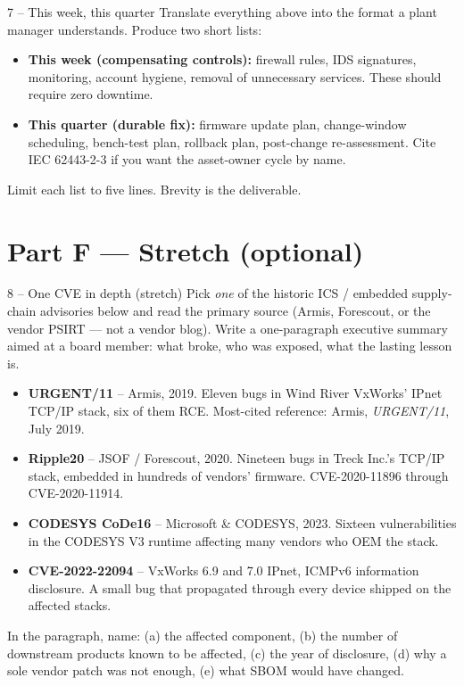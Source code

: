 \documentclass[11pt,a4paper]{article}
\begin{document}
\begin{stepbox}{7 -- This week, this quarter}
Translate everything above into the format a plant manager understands. Produce two short lists:

\begin{itemize}\setlength{\itemsep}{1pt}
  \item \textbf{This week (compensating controls):} firewall rules, IDS signatures, monitoring, account hygiene, removal of unnecessary services. These should require zero downtime.
  \item \textbf{This quarter (durable fix):} firmware update plan, change-window scheduling, bench-test plan, rollback plan, post-change re-assessment. Cite IEC 62443-2-3 if you want the asset-owner cycle by name.
\end{itemize}

Limit each list to five lines. Brevity is the deliverable.
\end{stepbox}

\section*{Part F --- Stretch (optional)}

\begin{stepbox}{8 -- One CVE in depth (stretch)}
Pick \emph{one} of the historic ICS / embedded supply-chain advisories below and read the primary source (Armis, Forescout, or the vendor PSIRT --- not a vendor blog). Write a one-paragraph executive summary aimed at a board member: what broke, who was exposed, what the lasting lesson is.

\begin{itemize}\setlength{\itemsep}{1pt}
  \item \textbf{URGENT/11} -- Armis, 2019. Eleven bugs in Wind River VxWorks' IPnet TCP/IP stack, six of them RCE. Most-cited reference: Armis, \emph{URGENT/11}, July 2019.
  \item \textbf{Ripple20} -- JSOF / Forescout, 2020. Nineteen bugs in Treck Inc.'s TCP/IP stack, embedded in hundreds of vendors' firmware. CVE-2020-11896 through CVE-2020-11914.
  \item \textbf{CODESYS CoDe16} -- Microsoft \& CODESYS, 2023. Sixteen vulnerabilities in the CODESYS V3 runtime affecting many vendors who OEM the stack.
  \item \textbf{CVE-2022-22094} -- VxWorks 6.9 and 7.0 IPnet, ICMPv6 information disclosure. A small bug that propagated through every device shipped on the affected stacks.
\end{itemize}

In the paragraph, name: (a) the affected component, (b) the number of downstream products known to be affected, (c) the year of disclosure, (d) why a sole vendor patch was not enough, (e) what SBOM would have changed.
\end{stepbox}
\end{document}
